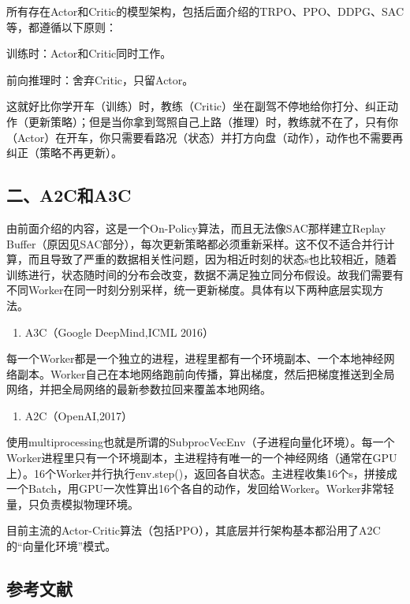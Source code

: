 所有存在Actor和Critic的模型架构，包括后面介绍的TRPO、PPO、DDPG、SAC等，都遵循以下原则：

训练时：Actor和Critic同时工作。

前向推理时：舍弃Critic，只留Actor。

这就好比你学开车（训练）时，教练（Critic）坐在副驾不停地给你打分、纠正动作（更新策略）；但是当你拿到驾照自己上路（推理）时，教练就不在了，只有你（Actor）在开车，你只需要看路况（状态）并打方向盘（动作），动作也不需要再纠正（策略不再更新）。

\hypertarget{ux4e8ca2cux548ca3c}{%
\subsection{二、A2C和A3C}\label{ux4e8ca2cux548ca3c}}

由前面介绍的内容，这是一个On-Policy算法，而且无法像SAC那样建立Replay Buffer（原因见SAC部分），每次更新策略都必须重新采样。这不仅不适合并行计算，而且导致了严重的数据相关性问题，因为相近时刻的状态s也比较相近，随着训练进行，状态随时间的分布会改变，数据不满足独立同分布假设。故我们需要有不同Worker在同一时刻分别采样，统一更新梯度。具体有以下两种底层实现方法。

\begin{enumerate}
\def\labelenumi{\arabic{enumi}.}
\tightlist
\item
  A3C（Google DeepMind,ICML 2016）
\end{enumerate}

每一个Worker都是一个独立的进程，进程里都有一个环境副本、一个本地神经网络副本。Worker自己在本地网络跑前向传播，算出梯度，然后把梯度推送到全局网络，并把全局网络的最新参数拉回来覆盖本地网络。

\begin{enumerate}
\def\labelenumi{\arabic{enumi}.}
\setcounter{enumi}{1}
\tightlist
\item
  A2C（OpenAI,2017）
\end{enumerate}

使用multiprocessing也就是所谓的SubprocVecEnv（子进程向量化环境）。每一个Worker进程里只有一个环境副本，主进程持有唯一的一个神经网络（通常在GPU上）。16个Worker并行执行env.step()，返回各自状态。主进程收集16个s，拼接成一个Batch，用GPU一次性算出16个各自的动作，发回给Worker。Worker非常轻量，只负责模拟物理环境。

目前主流的Actor-Critic算法（包括PPO），其底层并行架构基本都沿用了A2C的``向量化环境''模式。

\hypertarget{ux53c2ux8003ux6587ux732e-54}{%
\subsection{参考文献}\label{ux53c2ux8003ux6587ux732e-54}}

